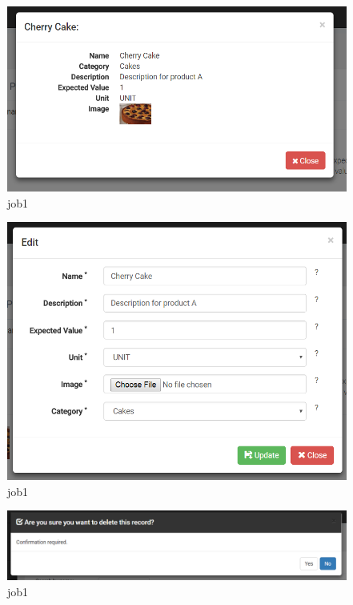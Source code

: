 \documentclass[a4paper,11pt,twoside]{report}
\theoremstyle{definition}
\begin{document}
\begin{figure}[h!]
\begin{center}
\includegraphics[width=\textwidth]{AS/product/5}
\end{center}
\caption{job1}
\end{figure}
\thispagestyle{empty}


\begin{figure}[h!]
\begin{center}
\includegraphics[width=\textwidth]{AS/product/6}
\end{center}
\caption{job1}
\end{figure}
\thispagestyle{empty}

\begin{figure}[h!]
\begin{center}
\includegraphics[width=\textwidth]{AS/product/7}
\end{center}
\caption{job1}
\end{figure}
\thispagestyle{empty}
\end{document}
